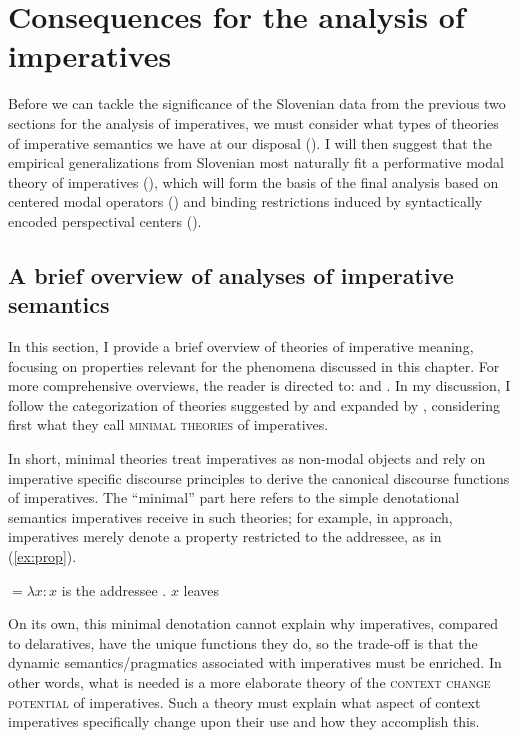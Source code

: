 \documentclass[output=paper,colorlinks,citecolor=brown]{langscibook}
\begin{document}
\section{Consequences for the analysis of imperatives}
\label{sec:implications}

Before we can tackle the significance of the Slovenian data from the previous two sections for the analysis of imperatives, we must consider what types of theories of imperative semantics we have at our disposal (). I will then suggest that the empirical generalizations from Slovenian most naturally fit a performative modal theory of imperatives (), which will form the basis of the final analysis based on centered modal operators () and binding restrictions induced by syntactically encoded perspectival centers (). 

\subsection{A brief overview of analyses of imperative semantics}
\label{subsec:imperative-semantics}

 In this section, I provide a brief overview of theories of imperative meaning, focusing on properties relevant for the phenomena discussed in this chapter. For more comprehensive overviews, the reader is directed to: \citet{kaufmannBOOK,kaufmann21,kaufmann24} and \citet{charlow14}. In my discussion, I follow the categorization of theories suggested by \textcite{finteliatridou17} and expanded by \textcite{kaufmannNCI}, considering first what they call \textsc{minimal theories} of imperatives. 

In short, minimal theories \citep[e.g.][]{portnerSALT,portner07,barker12,finteliatridou17} treat imperatives as non-modal objects and rely on imperative specific discourse principles to derive the canonical discourse functions of imperatives. The ``minimal'' part here refers to the simple denotational semantics imperatives receive in such theories; for example, in  approach, imperatives merely denote a property restricted to the addressee, as in (\ref{ex:prop}).

\ea \label{ex:prop}
${}=\lambda x : x$ is the addressee . $x$ leaves
\z

\noindent On its own, this minimal denotation cannot explain why imperatives, compared to delaratives, have the unique functions they do, so the trade-off is that the dynamic semantics/pragmatics associated with imperatives must be enriched. In other words, what is needed is a more elaborate theory of the \textsc{context change potential} \citep{Heim1982,groenendijkstokhof91,Kamp1993} of imperatives. Such a theory must explain what aspect of context imperatives specifically change upon their use and how they accomplish this.     
\end{document}
